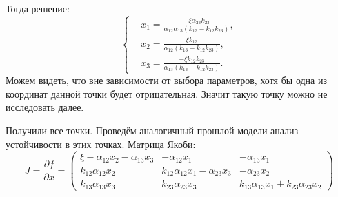 \begin{enumerate}
            Тогда решение:
            \[
                \left\{\begin{split}
                    & x_1 = \frac{-\xi \alpha_{23} k_{23}}{\alpha_{12} \alpha_{13} (k_{13} - k_{12} k_{23})}, \\
                    & x_2 = \frac{\xi k_{13}}{\alpha_{12} (k_{13} - k_{12} k_{23})}, \\ 
                    & x_3 = \frac{-\xi k_{12} k_{23}}{\alpha_{13} (k_{13} - k_{12} k_{23})}.
                \end{split}\right.
            \]
            Можем видеть, что вне зависимости от выбора параметров, хотя бы одна из координат данной точки будет отрицательная. Значит такую точку можно не исследовать далее.
    \end{enumerate}

    Получили все точки. Проведём аналогичный прошлой модели анализ устойчивости в этих точках.
    Матрица Якоби:
    \[
        J = \frac{\partial f}{\partial x} = \left(\begin{matrix}
            \xi - \alpha_{12} x_2 - \alpha_{13} x_3 & -\alpha_{12} x_1 & -\alpha_{13} x_1 \\
            k_{12} \alpha_{12} x_2 & k_{12} \alpha_{12} x_1 - \alpha_{23} x_3 & -\alpha_{23} x_2 \\
            k_{13} \alpha_{13} x_3 & k_{23} \alpha_{23} x_3  & k_{13} \alpha_{13} x_1 + k_{23} \alpha_{23} x_2
        \end{matrix}\right)
    \]

